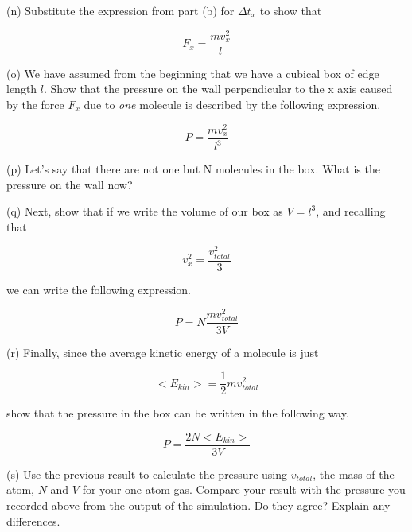 (n) Substitute the expression from part (b) for \( \Delta t_{x} \)
to show that 

\[
F_{x}=\frac{mv_{x}^{2}}{l}\]

\vspace{20mm}

(o) We have assumed from the beginning that we have a cubical box of edge length $l$. Show
that the pressure on the wall perpendicular to the x axis caused by
the force \( F_{x} \) due to \emph{one} molecule is described by
the following expression.

\[
P=\frac{mv_{x}^{2}}{l^{3}}\]

\vspace{20mm}

(p) Let's say that there are not one but N molecules in the box. What
is the pressure on the wall now?
\vspace{20mm}

(q) Next, show that if we write the volume of our box as \( V=l^{3} \),
and recalling that

\[
v_{x}^{2}=\frac{v_{total}^{2}}{3}\]


we can write the following expression.

\[
P=N\frac{mv_{total}^{2}}{3V}\]

\vspace{20mm}

(r) Finally, since the average kinetic energy of a molecule is just

\[
<E_{kin}>=\frac{1}{2}mv_{total}^{2}\]


show that the pressure in the box can be written in the following
way.

\[
P=\frac{2N<E_{kin}>}{3V}\]
\vspace{20mm}

(s) Use the previous result to calculate the pressure using $v_{total}$, the mass of the
atom, $N$ and $V$ for your one-atom gas. Compare your result with the pressure you recorded above from the
output of the simulation.
Do they agree?
Explain any differences.
\vspace{20mm}
